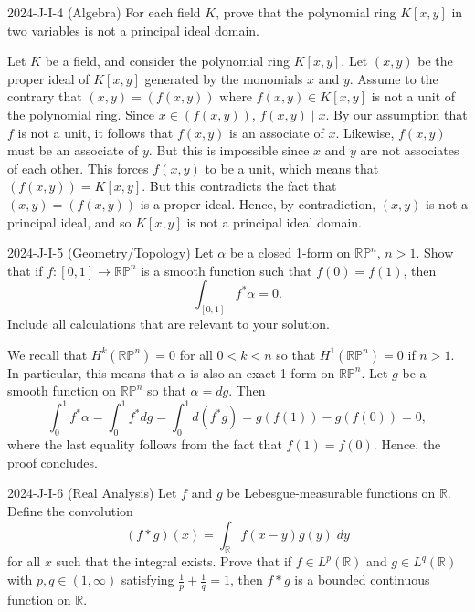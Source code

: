 \documentclass{article}
\begin{document}
\begin{prb}{2024-J-I-4 (Algebra)}
	For each field $K$, prove that the polynomial ring $K[x, y]$ in two variables is not a principal ideal domain. 
\end{prb}
\begin{solutions}
	Let $K$ be a field, and consider the polynomial ring $K[x, y]$. Let $(x, y)$ be the proper ideal of $K[x, y]$ generated by the monomials $x$ and $y$. Assume to the contrary that $(x, y) = (f(x,y))$ where $f(x, y) \in K[x, y]$ is not a unit of the polynomial ring. Since $x \in (f(x, y))$, $f(x, y) \mid x$. By our assumption that $f$ is not a unit, it follows that $f(x, y)$ is an associate of $x$. Likewise, $f(x, y)$ must be an associate of $y$. But this is impossible since $x$ and $y$ are not associates of each other. This forces $f(x, y)$ to be a unit, which means that $(f(x, y)) = K[x, y]$. But this contradicts the fact that $(x, y) = (f(x, y))$ is a proper ideal. Hence, by contradiction, $(x, y)$ is not a principal ideal, and so $K[x, y]$ is not a principal ideal domain. 
\end{solutions}
\begin{prb}{2024-J-I-5 (Geometry/Topology)}
	Let $\alpha$ be a closed 1-form on $\mathbb{RP}^{n}$, $n > 1$. Show that if $f:[0,1] \to \mathbb{RP}^{n}$ is a smooth function such that $f(0) = f(1)$, then 
		\begin{equation*}
			\int_{[0,1]}f^{\ast}\alpha = 0. 
		\end{equation*}
	Include all calculations that are relevant to your solution. 
\end{prb}
\begin{solutions}
	We recall that $H^{k}(\mathbb{RP}^{n}) = 0$ for all $0 < k < n$ so that $H^{1}(\mathbb{RP}^{n}) = 0$ if $n > 1$. In particular, this means that $\alpha$ is also an exact 1-form on $\mathbb{RP}^{n}$. Let $g$ be a smooth function on $\mathbb{RP}^{n}$ so that $\alpha = dg$. Then 
		\begin{equation}
			\int_{0}^{1}f^{\ast}\alpha = \int_{0}^{1}f^{\ast}dg = \int_{0}^{1}d(f^{\ast}g) = g(f(1)) - g(f(0)) = 0, 
		\end{equation}
	where the last equality follows from the fact that $f(1) = f(0)$. Hence, the proof concludes. 
\end{solutions}
\begin{prb}{2024-J-I-6 (Real Analysis)}
	Let $f$ and $g$ be Lebesgue-measurable functions on $\mathbb{R}$. Define the convolution 
		\begin{equation*}
			(f \ast g)(x) = \int_{\mathbb{R}}f(x - y)g(y)\;dy
		\end{equation*}
	for all $x$ such that the integral exists. Prove that if $f \in L^{p}(\mathbb{R})$ and $g \in L^{q}(\mathbb{R})$ with $p, q \in (1, \infty)$ satisfying $\frac{1}{p} + \frac{1}{q} = 1$, then $f \ast g$ is a bounded continuous function on $\mathbb{R}$. 
\end{prb}
\end{document}
